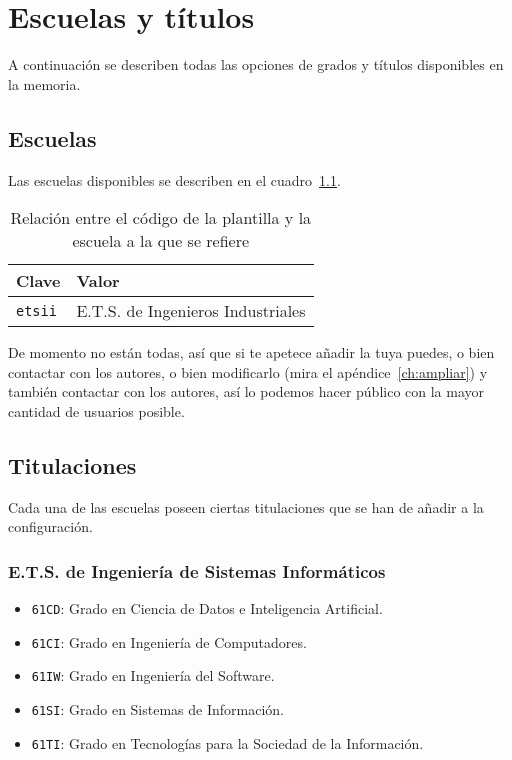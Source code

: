 \chapter{Escuelas y títulos}
\label{ch:escuelas-y-titulos}

A continuación se describen todas las opciones de grados y títulos disponibles en la memoria.

\section{Escuelas}

Las escuelas disponibles se describen en el cuadro~\ref{tbl:schools}.

\begin{table}[h]
    \centering
    \begin{tabular}{@{}ll@{}}
        \toprule
        \textbf{Clave}  & \textbf{Valor} \\
        \midrule
        \texttt{etsii}  & E.T.S. de Ingenieros Industriales \\
        \bottomrule
    \end{tabular}
    \caption{\label{tbl:schools} Relación entre el código de la plantilla y la escuela a la que se refiere}
\end{table}

De momento no están todas, así que si te apetece añadir la tuya puedes, o bien contactar con los autores, o bien modificarlo (mira el apéndice~\ref{ch:ampliar}) y también contactar con los autores, así lo podemos hacer público con la mayor cantidad de usuarios posible.

\section{Titulaciones}

Cada una de las escuelas poseen ciertas titulaciones que se han de añadir a la configuración.

\subsection{E.T.S. de Ingeniería de Sistemas Informáticos}

\begin{itemize}
    \item \texttt{61CD}: Grado en Ciencia de Datos e Inteligencia Artificial.
    \item \texttt{61CI}: Grado en Ingeniería de Computadores.
    \item \texttt{61IW}: Grado en Ingeniería del Software.
    \item \texttt{61SI}: Grado en Sistemas de Información.
    \item \texttt{61TI}: Grado en Tecnologías para la Sociedad de la Información.
\end{itemize}

